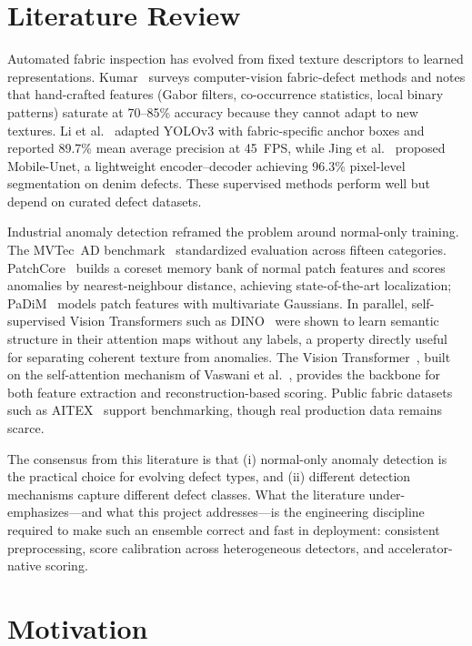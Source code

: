 \section[Literature Review]{\textbf{Literature Review}}

Automated fabric inspection has evolved from fixed texture descriptors to learned representations. Kumar~\cite{kumar2019survey} surveys computer-vision fabric-defect methods and notes that hand-crafted features (Gabor filters, co-occurrence statistics, local binary patterns) saturate at 70--85\% accuracy because they cannot adapt to new textures. Li et al.~\cite{li2020yolo} adapted YOLOv3 with fabric-specific anchor boxes and reported 89.7\% mean average precision at 45~FPS, while Jing et al.~\cite{jing2022mobileunet} proposed Mobile-Unet, a lightweight encoder--decoder achieving 96.3\% pixel-level segmentation on denim defects. These supervised methods perform well but depend on curated defect datasets.

Industrial anomaly detection reframed the problem around normal-only training. The MVTec~AD benchmark~\cite{bergmann2019mvtec} standardized evaluation across fifteen categories. PatchCore~\cite{roth2022patchcore} builds a coreset memory bank of normal patch features and scores anomalies by nearest-neighbour distance, achieving state-of-the-art localization; PaDiM~\cite{defard2021padim} models patch features with multivariate Gaussians. In parallel, self-supervised Vision Transformers such as DINO~\cite{caron2021dino} were shown to learn semantic structure in their attention maps without any labels, a property directly useful for separating coherent texture from anomalies. The Vision Transformer~\cite{dosovitskiy2021vit}, built on the self-attention mechanism of Vaswani et al.~\cite{vaswani2017attention}, provides the backbone for both feature extraction and reconstruction-based scoring. Public fabric datasets such as AITEX~\cite{silva2020aitex} support benchmarking, though real production data remains scarce.

The consensus from this literature is that (i) normal-only anomaly detection is the practical choice for evolving defect types, and (ii) different detection mechanisms capture different defect classes. What the literature under-emphasizes---and what this project addresses---is the engineering discipline required to make such an ensemble correct and fast in deployment: consistent preprocessing, score calibration across heterogeneous detectors, and accelerator-native scoring.

\section[Motivation]{\textbf{Motivation}}

